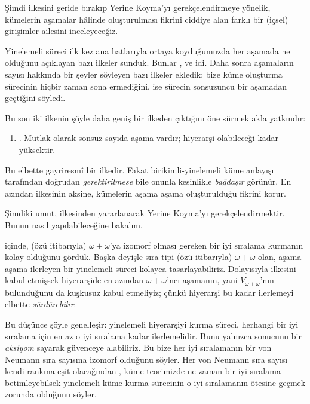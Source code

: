 


Şimdi \limofsize{} ilkesini geride bırakıp Yerine Koyma'yı
gerekçelendirmeye yönelik, kümelerin aşamalar hâlinde oluşturulması fikrini
ciddiye alan farklı bir (içsel) girişimler ailesini inceleyeceğiz.

Yinelemeli süreci ilk kez ana hatlarıyla ortaya koyduğumuzda her aşamada ne
olduğunu açıklayan bazı ilkeler sunduk. Bunlar \stageshier, \stagesord{} ve
\stagesacc{} idi. Daha sonra aşamaların sayısı hakkında bir şeyler söyleyen
bazı ilkeler ekledik: \stagessucc{} bize küme oluşturma sürecinin hiçbir zaman
sona ermediğini, \stagesinf{} ise sürecin sonsuzuncu bir aşamadan geçtiğini
söyledi.

Bu son iki ilkenin şöyle daha geniş bir ilkeden çıktığını öne sürmek
akla yatkındır:
\begin{enumerate}
	\item[] \stagesinex. Mutlak olarak sonsuz sayıda aşama vardır;
	hiyerarşi olabileceği kadar yüksektir.
\end{enumerate}
Bu elbette gayriresmî bir ilkedir. Fakat birikimli-yinelemeli küme anlayışı
tarafından doğrudan \emph{gerektirilmese} bile onunla kesinlikle
\emph{bağdaşır} görünür. En azından \limofsize{} ilkesinin aksine, kümelerin
aşama aşama oluşturulduğu fikrini korur.

Şimdiki umut, \stagesinex{} ilkesinden yararlanarak Yerine Koyma'yı
gerekçelendirmektir. Bunun nasıl yapılabileceğine bakalım.

 içinde, (özü itibarıyla) $\omega+\omega$'ya
izomorf olması gereken bir iyi sıralama kurmanın kolay olduğunu gördük. Başka
deyişle sıra tipi (özü itibarıyla) $\omega+\omega$ olan, aşama aşama ilerleyen
bir yinelemeli süreci kolayca tasarlayabiliriz. Dolayısıyla \stagesinex{}
ilkesini kabul etmişsek hiyerarşide en azından $\omega+\omega$'ncı aşamanın,
yani $V_{\omega+\omega}$'nın bulunduğunu da kuşkusuz kabul etmeliyiz; çünkü
hiyerarşi bu kadar ilerlemeyi elbette \emph{sürdürebilir}.

Bu düşünce şöyle genelleşir: yinelemeli hiyerarşiyi kurma süreci, herhangi bir
iyi sıralama için en az o iyi sıralama kadar ilerlemelidir. Bunu yalnızca
 sonucunu bir
\emph{aksiyom} sayarak güvenceye alabiliriz. Bu bize her iyi sıralamanın bir
von Neumann sıra sayısına izomorf olduğunu söyler. Her von Neumann sıra sayısı
kendi rankına eşit olacağından
, küme teorimizde ne zaman
bir iyi sıralama betimleyebilsek yinelemeli küme kurma sürecinin o iyi
sıralamanın ötesine geçmek zorunda olduğunu söyler.

